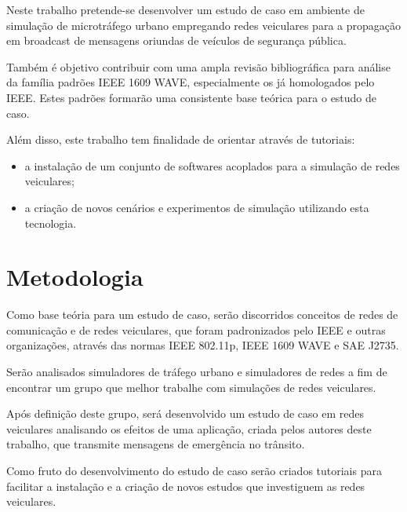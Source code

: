 \documentclass[
12pt,				%
openright,			%
oneside,			%
a4paper,			%
brazil,				%
]{abntex2}
\begin{document}
	\par Neste trabalho pretende-se desenvolver um estudo de caso em ambiente de simulação de microtráfego urbano empregando redes veiculares para a propagação em broadcast de mensagens oriundas de veículos de segurança pública. 
	
	Também é objetivo contribuir com uma ampla revisão bibliográfica para análise da família padrões IEEE 1609 WAVE, especialmente os já homologados pelo IEEE. Estes padrões formarão uma consistente base teórica para o estudo de caso.
	
	\par Além disso, este trabalho tem finalidade de orientar através de tutoriais:
	
	\begin{itemize}
		\item a instalação de um conjunto de softwares acoplados para a simulação de redes veiculares;
		\item a criação de novos cenários e experimentos de simulação utilizando esta tecnologia.
	\end{itemize}
	
	\section{Metodologia}
	
	\par Como base teória para um estudo de caso, serão discorridos conceitos de redes de comunicação e de redes veiculares, que foram padronizados pelo IEEE e outras organizações, através das normas IEEE 802.11p, IEEE 1609 WAVE e SAE J2735. 
	
	\par Serão analisados simuladores de tráfego urbano e simuladores de redes a fim de encontrar um grupo que melhor trabalhe com simulações de redes veiculares. 
	
	\par Após definição deste grupo, será desenvolvido um estudo de caso em redes veiculares analisando os efeitos de uma aplicação, criada pelos autores deste trabalho, que transmite mensagens de emergência no trânsito. 

	\par Como fruto do desenvolvimento do estudo de caso serão criados tutoriais para facilitar a instalação e a criação de novos estudos que investiguem as redes veiculares.
	
	\newpage
	
\end{document}
